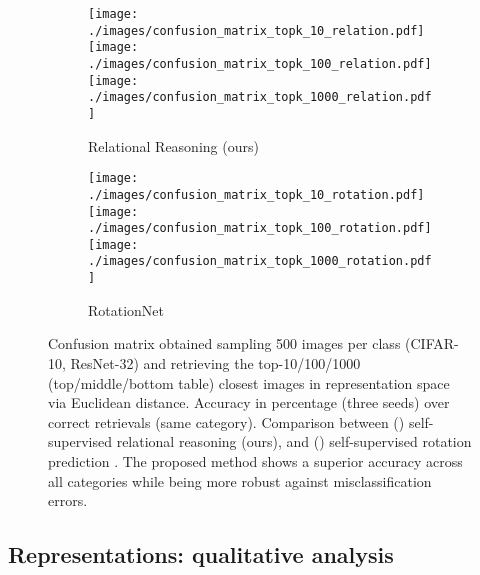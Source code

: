 \documentclass{article}
\begin{document}
\begin{figure}[H]
    \begin{subfigure}[t]{0.5\textwidth}
        \centering
\texttt{[image: ./images/confusion\_matrix\_topk\_10\_relation.pdf]}
        \texttt{[image: ./images/confusion\_matrix\_topk\_100\_relation.pdf]}
        \texttt{[image: ./images/confusion\_matrix\_topk\_1000\_relation.pdf]} 
        \caption{Relational Reasoning (ours)}
        \label{fig:retrieval-error-relation}
    \end{subfigure}
    \begin{subfigure}[t]{0.5\textwidth}
        \centering
        \texttt{[image: ./images/confusion\_matrix\_topk\_10\_rotation.pdf]}
        \texttt{[image: ./images/confusion\_matrix\_topk\_100\_rotation.pdf]}
        \texttt{[image: ./images/confusion\_matrix\_topk\_1000\_rotation.pdf]}
        \caption{RotationNet}
        \label{fig:retrieval-error-rotation}
    \end{subfigure}
    \caption{Confusion matrix obtained sampling 500 images per class (CIFAR-10, ResNet-32) and retrieving the top-10/100/1000 (top/middle/bottom table) closest images in representation space via Euclidean distance. Accuracy in percentage (three seeds) over correct retrievals (same category). Comparison between () self-supervised relational reasoning (ours), and () self-supervised rotation prediction \citep{gidaris2018unsupervised}. The proposed method shows a superior accuracy across all categories while being more robust against misclassification errors.}
    \label{fig:retrieval-error}
\end{figure}

\subsection{Representations: qualitative analysis}\label{appendix:additional_qualitative}
\FloatBarrier
\end{document}
